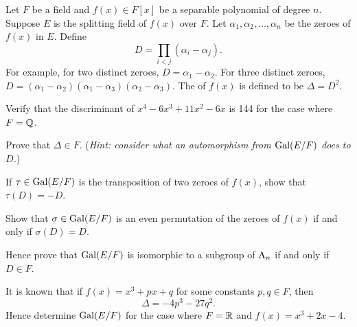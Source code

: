 \begin{problem}
    Let $F$ be a field and $f(x) \in F[x]$ be a separable polynomial of degree $n$. Suppose $E$ is the splitting field of $f(x)$ over $F$. Let $\alpha_1, \alpha_2, \dots, \alpha_n$ be the zeroes of $f(x)$ in $E$. Define
    \[
        D = \prod_{i<j}(\alpha_i - \alpha_j).
    \]
    For example, for two distinct zeroes, $D = \alpha_1 - \alpha_2$. For three distinct zeroes, $D = (\alpha_1-\alpha_2)(\alpha_1-\alpha_3)(\alpha_2-\alpha_3)$. The  of $f(x)$ is defined to be $\Delta = D^2$.
    \begin{partquestions}{\roman*}
        \item Verify that the discriminant of $x^4 - 6x^3 + 11x^2 - 6x$ is 144 for the case where $F = \mathbb{Q}$.
        \item Prove that $\Delta \in F$.\newline
        (\textit{Hint: consider what an automorphism from $\mathrm{Gal}(E/F)$ does to $D$.})
        \item If $\tau \in \mathrm{Gal}(E/F)$ is the transposition of two zeroes of $f(x)$, show that $\tau(D) = -D$.
        \item Show that $\sigma \in \mathrm{Gal}(E/F)$ is an even permutation of the zeroes of $f(x)$ if and only if $\sigma(D) = D$.
        \item Hence prove that $\mathrm{Gal}(E/F)$ is isomorphic to a subgroup of $\mathrm{A}_{n}$ if and only if $D \in F$.
        \item It is known that if $f(x) = x^3 + px + q$ for some constants $p, q \in F$, then
        \[
            \Delta = -4p^3 - 27q^2.
        \]
        Hence determine $\mathrm{Gal}(E/F)$ for the case where $F = \mathbb{R}$ and $f(x) = x^3 + 2x - 4$.
    \end{partquestions}
\end{problem}
